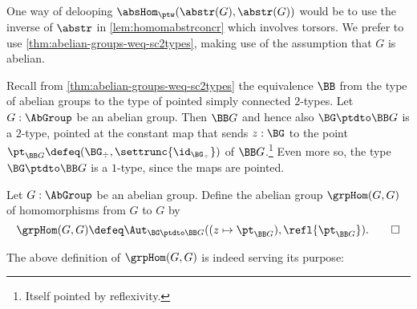 One way of delooping $\absHom_{\ptw}(\abstr(G),\abstr(G))$ would be
to use the inverse of $\abstr$ in \cref{lem:homomabstrconcr}
which involves torsors.  
We prefer to use \cref{thm:abelian-groups-weq-sc2types},
making use of the assumption that $G$ is abelian.

Recall from \cref{thm:abelian-groups-weq-sc2types} the equivalence
$\BB$ from the type of abelian groups to the type of pointed
simply connected $2$-types. Let $G:\AbGroup$ be an abelian group.
Then $\BB G$ and hence also $\BG\ptdto\BB G$ is a $2$-type, 
pointed at the constant map that sends
$z:\BG$ to the point $\pt_{\BB G}\defeq (\BG_\div,\settrunc{\id_{\BG_\div}})$ 
of $\BB G$.\footnote{Itself pointed by reflexivity.} Even more so,
the type $\BG\ptdto\BB G$ is a $1$-type, since the maps are pointed.



\begin{definition}\label{def:AbHomgroup}
Let $G:\AbGroup$ be an abelian group. Define the abelian group $\grpHom(G,G)$
of homomorphisms from $G$ to $G$ by 
\[
\grpHom(G,G) \defeq \Aut_{\BG\ptdto\BB G}
((z\mapsto \pt_{\BB G}),\refl{\pt_{\BB G}}).\qedhere
\]
\end{definition}

The above definition of $\grpHom(G,G)$ is indeed serving its purpose:

